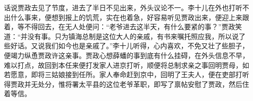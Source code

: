 


\begin{parag}
    话说贾政去见了节度，进去了半日不见出来，外头议论不一。李十儿在外也打听不出什么事来，便想到报上的饥荒，实在也着急，好容易听见贾政出来，便迎上来跟着，等不得回去，在无人处便问：“老爷进去这半天，有什么要紧的事？”贾政笑道：“并没有事。只为镇海总制是这位大人的亲戚，有书来嘱托照应我，所以说了些好话。又说我们如今也是亲戚了。”李十儿听得，心内喜欢，不免又壮了些胆子，便竭力纵恿贾政许这亲事。贾政心想薛蟠的事到底有什么挂碍，在外头信息不早，难以打点，故回到本任来便打发家人进京打听，顺便将总制求亲之事回明贾母，如若愿意，即将三姑娘接到任所。家人奉命赶到京中，回明了王夫人，便在吏部打听得贾政并无处分，惟将署太平县的这位老爷革职，即写了禀帖安慰了贾政，然后住着等信。
\end{parag}


